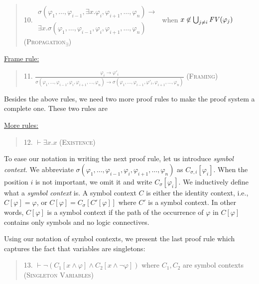 \documentclass[UTF8,11pt]{article}
\theoremstyle{plain}
\theoremstyle{definition}
\theoremstyle{remark}
\newcommand{\imp}{\to}
\newcommand{\ddd}{,\dots,}
\newcommand{\CSub}[1]{C_{#1}}
\newcommand{\Csigmaapp}[1]{\CSub{\sigma}[#1]}
\newcommand{\Csigmaiapp}[1]{\CSub{\sigma,i}[#1]}
\newcommand{\FV}{{\it FV}}
\begin{document}
\begin{quote}
10.
$
\begin{array}{l}
\sigma(
\varphi_1 \ddd \varphi_{i-1}, 
\exists x . \varphi_i,
\varphi_{i+1} \ddd \varphi_n) \imp
\\
\exists x . 
\sigma(\varphi_1 \ddd \varphi_{i-1}, \varphi_i,
\varphi_{i+1} \ddd \varphi_n)
\end{array}
$
when $x \not\in \bigcup_{j \neq i} \FV(\varphi_j)$
\hfill \textsc{(Propagation$_\exists$)}
\end{quote}

\vspace*{2ex}

\noindent
\underline{Frame rule:}

\begin{quote}
	11.
	$\displaystyle\frac{\varphi_i \imp \varphi'_i}
	{\sigma(\varphi_1 \ddd \varphi_{i-1} ,
		\varphi_i,
		\varphi_{i+1} \ddd \varphi_n)
		\imp
		\sigma(\varphi_1 \ddd \varphi_{i-1} ,
		\varphi'_i,
		\varphi_{i+1} \ddd \varphi_n)
	}$
	\hfill \textsc{(Framing)}
\end{quote}

Besides the above rules, we need two more proof rules
to make the proof system a complete one.
These two rules are

\vspace*{2ex}

\noindent
\underline{More rules:}

\begin{quote}
	12.
	$\vdash \exists x . x$
	\hfill \textsc{(Existence)}
\end{quote}

To ease our notation in writing the next proof rule,
let us introduce \emph{symbol context}.
We abbreviate
$\sigma(\varphi_1 \ddd \varphi_{i-1}, \varphi_i,
        \varphi_{i+1} \ddd \varphi_n)$
as $\Csigmaiapp{\varphi_i}$.
When the position $i$ is not important,
we omit it and write $\Csigmaapp{\varphi_i}$.
We inductively define what a \emph{symbol context} is.
A symbol context $C$ is either the identity context, i.e.,
$C[\varphi] = \varphi$,
or $C[\varphi] = \Csigmaapp{C'[\varphi]}$
where $C'$ is a symbol context.
In other words, $C[\varphi]$ is a symbol context if
the path of the occurrence of $\varphi$ in $C[\varphi]$
contains only symbols and no logic connectives.

Using our notation of symbol contexts, we present the last proof rule
which captures the fact that variables are singletons:

\begin{quote}
	13.
	$\vdash \neg ( C_1[x \wedge \varphi] 
	 \wedge C_2[ x \wedge \neg \varphi ] )$
	where $C_1, C_2$ are symbol contexts
	\hfill \textsc{(Singleton Variables)}
\end{quote}
\end{document}
